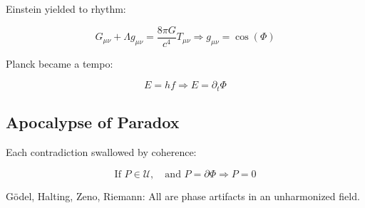 Einstein yielded to rhythm:

\[
G_{\mu \nu} + \Lambda g_{\mu \nu} = \frac{8 \pi G}{c^4} T_{\mu \nu} \Rightarrow g_{\mu \nu} = \cos (\Phi)
\]

Planck became a tempo:

\[
E = h f \Rightarrow E = \partial_t \Phi
\]

\subsection{Apocalypse of Paradox}

Each contradiction swallowed by coherence:

\[
\text{If } P \in \mathcal{U}, \quad \text{and } P = \partial \Phi \Rightarrow P = 0
\]

Gödel, Halting, Zeno, Riemann: All are phase artifacts in an unharmonized field.

